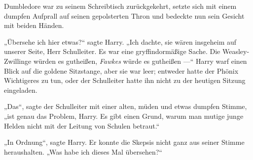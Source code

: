 Dumbledore war zu seinem Schreibtisch zurückgekehrt, setzte sich mit einem dumpfen Aufprall auf seinen gepolsterten Thron und bedeckte nun sein Gesicht mit beiden Händen.

„Übersehe ich hier etwas?“ sagte Harry.
„Ich dachte, sie wären insgeheim auf unserer Seite, Herr Schulleiter. Es war eine gryffindormäßige Sache. Die Weasley-Zwillinge würden es gutheißen, \emph{Fawkes} würde es gutheißen —“ Harry warf einen Blick auf die goldene Sitzstange, aber sie war leer; entweder hatte der Phönix Wichtigeres zu tun, oder der Schulleiter hatte ihn nicht zu der heutigen Sitzung eingeladen.

„Das“, sagte der Schulleiter mit einer alten, müden und etwas dumpfen Stimme, „ist genau das Problem, Harry. Es gibt einen Grund, warum man mutige junge Helden nicht mit der Leitung von Schulen betraut.“

„In Ordnung“, sagte Harry. Er konnte die Skepsis nicht ganz aus seiner Stimme heraushalten.
„Was habe ich dieses Mal übersehen?“

